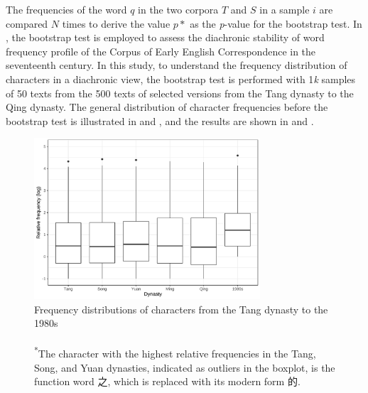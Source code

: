 The frequencies of the word $q$ in the two corpora $T$ and $S$ in a sample $i$ are compared $N$ times to derive the value $p*$ as the \textit{p}-value for the bootstrap test. In \textcite{lijffijt2012ceecing}, the bootstrap test is employed to assess the diachronic stability of word frequency profile of the Corpus of Early English Correspondence in the seventeenth century. In this study, to understand the frequency distribution of characters in a diachronic view, the bootstrap test is performed with 1\textit{k} samples of 50 texts from the 500 texts of selected versions from the Tang dynasty to the Qing dynasty. The general distribution of character frequencies before the bootstrap test is illustrated in  and , and the results are shown in  and .

\begin{figure}[H]
  \centering
  \includegraphics[width=0.75\textwidth,keepaspectratio]{figures_new/char_freq/char_freq_dist_boxplot.pdf}
  \caption[Frequency distributions of characters from the Tang dynasty to the 1980s]%
  {Frequency distributions of characters from the Tang dynasty to the 1980s\\%
    \footnotesize{\\\textsuperscript{*}The character with the highest relative frequencies in the Tang, Song, and Yuan dynasties, indicated as outliers in the boxplot, is the function word 之, which is replaced with its modern form 的.}}
  \label{fig:freq_dist}
\end{figure}

